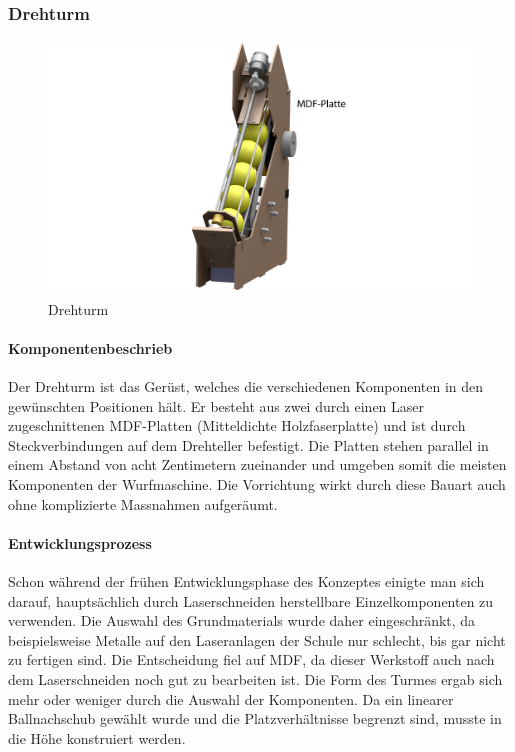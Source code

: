 \subsubsection{Drehturm}
\begin{figure}[h!]
	\centering
	\includegraphics[width=\linewidth]{../../fig/Render-Drehturmx}
	\caption{Drehturm}
	\label{fig:Drehturm}
\end{figure}

\paragraph{Komponentenbeschrieb}
Der Drehturm ist das Gerüst, welches die verschiedenen Komponenten in den gewünschten Positionen hält. Er besteht aus zwei durch einen Laser zugeschnittenen MDF-Platten (Mitteldichte Holzfaserplatte) und ist durch Steckverbindungen auf dem Drehteller befestigt. Die Platten stehen parallel in einem Abstand von acht Zentimetern zueinander und umgeben somit die meisten Komponenten der Wurfmaschine. Die Vorrichtung wirkt durch diese Bauart auch ohne komplizierte Massnahmen aufgeräumt.

\paragraph{Entwicklungsprozess}
Schon während der frühen Entwicklungsphase des Konzeptes einigte man sich darauf, hauptsächlich durch Laserschneiden herstellbare Einzelkomponenten zu verwenden. Die Auswahl des Grundmaterials wurde daher eingeschränkt, da beispielsweise Metalle auf den Laseranlagen der Schule nur schlecht, bis gar nicht zu fertigen sind. Die Entscheidung fiel auf MDF, da dieser Werkstoff auch nach dem Laserschneiden noch gut zu bearbeiten ist. Die Form des Turmes ergab sich mehr oder weniger durch die Auswahl der Komponenten. Da ein linearer Ballnachschub gewählt wurde und die Platzverhältnisse begrenzt sind, musste in die Höhe konstruiert werden.